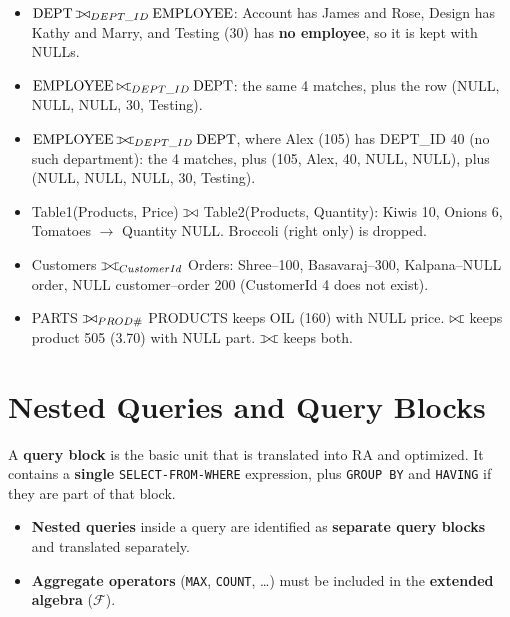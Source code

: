 \documentclass[10pt,a4paper]{article}
\def\ojoin{\setbox0=\hbox{$\bowtie$}\rule[-.02ex]{.25em}{.4pt}\llap{\rule[\ht0]{.25em}{.4pt}}}
\def\lojoin{\mathbin{\ojoin\mkern-5.8mu\bowtie}}
\def\rojoin{\mathbin{\bowtie\mkern-5.8mu\ojoin}}
\def\fojoin{\mathbin{\ojoin\mkern-5.8mu\bowtie\mkern-5.8mu\ojoin}}
\newcommand{\R}[1]{\mathrm{#1}}          %
\newcommand{\agg}{\mathcal{F}}            %
\begin{document}
\begin{exbox}
\begin{itemize}
  \item $\R{DEPT} \lojoin_{DEPT\_ID} \R{EMPLOYEE}$: Account has James and Rose, Design has Kathy and Marry, and Testing (30) has \textbf{no employee}, so it is kept with NULLs.
  \item $\R{EMPLOYEE} \rojoin_{DEPT\_ID} \R{DEPT}$: the same 4 matches, plus the row (NULL, NULL, NULL, 30, Testing).
  \item $\R{EMPLOYEE} \fojoin_{DEPT\_ID} \R{DEPT}$, where Alex (105) has DEPT\_ID 40 (no such department): the 4 matches, plus (105, Alex, 40, NULL, NULL), plus (NULL, NULL, NULL, 30, Testing).
  \item Table1(Products, Price) $\lojoin$ Table2(Products, Quantity): Kiwis 10, Onions 6, Tomatoes $\to$ Quantity NULL. Broccoli (right only) is dropped.
  \item Customers $\fojoin_{CustomerId}$ Orders: Shree--100, Basavaraj--300, Kalpana--NULL order, NULL customer--order 200 (CustomerId 4 does not exist).
  \item PARTS $\lojoin_{PROD\#}$ PRODUCTS keeps OIL (160) with NULL price. $\rojoin$ keeps product 505 (3.70) with NULL part. $\fojoin$ keeps both.
\end{itemize}
\end{exbox}

\section{Nested Queries and Query Blocks}

\begin{keybox}
A \textbf{query block} is the basic unit that is translated into RA and optimized. It contains a \textbf{single} \texttt{SELECT-FROM-WHERE} expression, plus \texttt{GROUP BY} and \texttt{HAVING} if they are part of that block.
\begin{itemize}
  \item \textbf{Nested queries} inside a query are identified as \textbf{separate query blocks} and translated separately.
  \item \textbf{Aggregate operators} (\texttt{MAX}, \texttt{COUNT}, \dots) must be included in the \textbf{extended algebra} ($\agg$).
\end{itemize}
\end{keybox}
\end{document}
